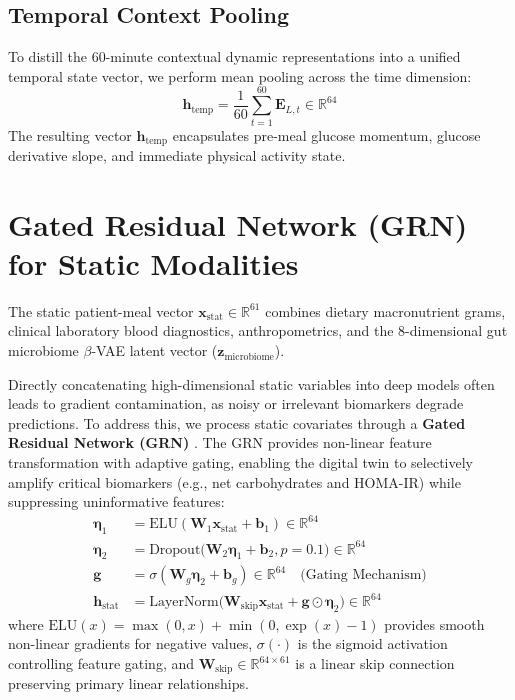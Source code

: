\subsection{Temporal Context Pooling}
To distill the 60-minute contextual dynamic representations into a unified temporal state vector, we perform mean pooling across the time dimension:
\begin{equation}
    \mathbf{h}_{\text{temp}} = \frac{1}{60} \sum_{t=1}^{60} \mathbf{E}_{L, t} \in \mathbb{R}^{64}
\end{equation}
The resulting vector $\mathbf{h}_{\text{temp}}$ encapsulates pre-meal glucose momentum, glucose derivative slope, and immediate physical activity state.

\section{Gated Residual Network (GRN) for Static Modalities}
The static patient-meal vector $\mathbf{x}_{\text{stat}} \in \mathbb{R}^{61}$ combines dietary macronutrient grams, clinical laboratory blood diagnostics, anthropometrics, and the 8-dimensional gut microbiome $\beta$-VAE latent vector ($\mathbf{z}_{\text{microbiome}}$). 

Directly concatenating high-dimensional static variables into deep models often leads to gradient contamination, as noisy or irrelevant biomarkers degrade predictions. To address this, we process static covariates through a \textbf{Gated Residual Network (GRN)} \cite{lim2021temporal}. The GRN provides non-linear feature transformation with adaptive gating, enabling the digital twin to selectively amplify critical biomarkers (e.g., net carbohydrates and HOMA-IR) while suppressing uninformative features:
\begin{align}
    \mathbf{\eta}_1 &= \text{ELU}(\mathbf{W}_1 \mathbf{x}_{\text{stat}} + \mathbf{b}_1) \in \mathbb{R}^{64} \\
    \mathbf{\eta}_2 &= \text{Dropout}\big(\mathbf{W}_2 \mathbf{\eta}_1 + \mathbf{b}_2, p=0.1\big) \in \mathbb{R}^{64} \\
    \mathbf{g} &= \sigma(\mathbf{W}_g \mathbf{\eta}_2 + \mathbf{b}_g) \in \mathbb{R}^{64} \quad \text{(Gating Mechanism)} \\
    \mathbf{h}_{\text{stat}} &= \text{LayerNorm}\Big(\mathbf{W}_{\text{skip}} \mathbf{x}_{\text{stat}} + \mathbf{g} \odot \mathbf{\eta}_2\Big) \in \mathbb{R}^{64}
\end{align}
where $\text{ELU}(x) = \max(0, x) + \min(0, \exp(x) - 1)$ provides smooth non-linear gradients for negative values, $\sigma(\cdot)$ is the sigmoid activation controlling feature gating, and $\mathbf{W}_{\text{skip}} \in \mathbb{R}^{64 \times 61}$ is a linear skip connection preserving primary linear relationships.

